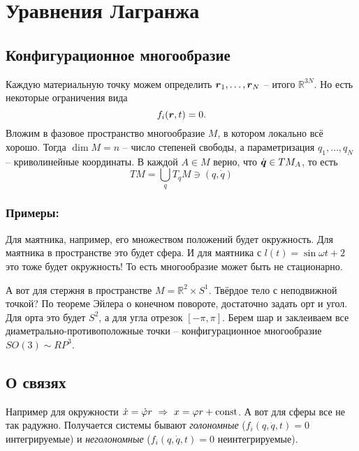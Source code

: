 \section{Уравнения Лагранжа}


\subsection{Конфигурационное многообразие}


Каждую материальную точку можем определить $\mbox{\boldmath $r$}_1, \ldots, \mbox{\boldmath $r$}_N$ -- итого $\mathbb{R}^{3N}$. Но есть некоторые ограничения вида
\begin{equation*}
    f_i (\mbox{\boldmath $r$}, t) = 0.
\end{equation*}
Вложим в фазовое пространство многообразие $M$, в котором локально всё хорошо. Тогда
$\dim M = n$ -- число степеней свободы, а параметризация $q_1, \ldots, q_N$ -- криволинейные координаты. В каждой $A \in M$ верно, что $\dot{\mbox{\boldmath $q$}} \in TM_A$, то есть
\begin{equation}
    TM = \bigcup_q T_qM \ni (q, \dot{q})
\end{equation}

\subsubsection*{Примеры:}
Для маятника, например, его множеством положений будет окружность. Для маятника в пространстве это будет сфера. И для маятника с $l(t) = \sin \omega t + 2$ это тоже будет окружность! То есть многообразие может быть не стационарно. 

А вот для стержня в пространстве $M = \mathbb{R}^2 \times S^1$. 
Твёрдое тело с неподвижной точкой? 
По теореме Эйлера о конечном повороте, достаточно задать орт и угол. Для орта это будет $S^2$, а для угла отрезок $[-\pi, \pi]$. Берем шар и заклеиваем все диаметрально-противоположные точки -- конфигурационное многообразие $SO(3) \sim RP^3$. 


\subsection{О связях}

Например для окружности $\dot{x} = \dot{\varphi} r \ \Rightarrow \ x = \varphi r + \text{const}$. А вот для сферы все не так радужно. Получается системы бывают \textit{голономные} ($f_i (q, \dot{q}, t) = 0$ интегрируемые) и \textit{неголономные}  ($f_i (q, \dot{q}, t) = 0$ неинтегрируемые). 

